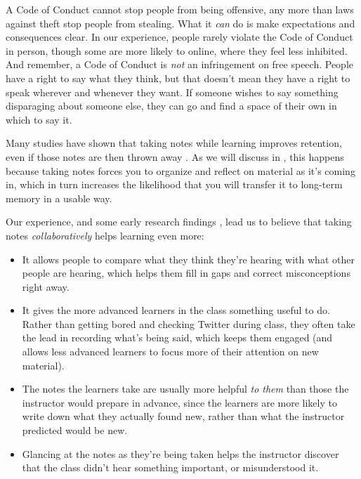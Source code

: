 A Code of Conduct cannot stop people from being offensive, any more
than laws against theft stop people from stealing. What it \emph{can}
do is make expectations and consequences clear.  In our experience,
people rarely violate the Code of Conduct in person, though some are
more likely to online, where they feel less inhibited.  And remember,
a Code of Conduct is \emph{not} an infringement on free speech.
People have a right to say what they think, but that doesn't mean they
have a right to speak wherever and whenever they want.  If someone
wishes to say something disparaging about someone else, they can go
and find a space of their own in which to say it.


Many studies have shown that taking notes while learning improves
retention, even if those notes are then thrown away \cite{fixme}.  As
we will discuss in , this happens because taking
notes forces you to organize and reflect on material as it's coming
in, which in turn increases the likelihood that you will transfer it
to long-term memory in a usable way.

Our experience, and some early research findings \cite{fixme}, lead us
to believe that taking notes \emph{collaboratively} helps learning
even more:

\begin{itemize}

\item
  It allows people to compare what they think they're hearing with
  what other people are hearing, which helps them fill in gaps and
  correct misconceptions right away.

\item
  It gives the more advanced learners in the class something useful to
  do.  Rather than getting bored and checking Twitter during class,
  they often take the lead in recording what's being said, which keeps
  them engaged (and allows less advanced learners to focus more of
  their attention on new material).

\item
  The notes the learners take are usually more helpful \emph{to them}
  than those the instructor would prepare in advance, since the learners
  are more likely to write down what they actually found new, rather than
  what the instructor predicted would be new.

\item
  Glancing at the notes as they're being taken helps the instructor
  discover that the class didn't hear something important, or
  misunderstood it.

\end{itemize}

